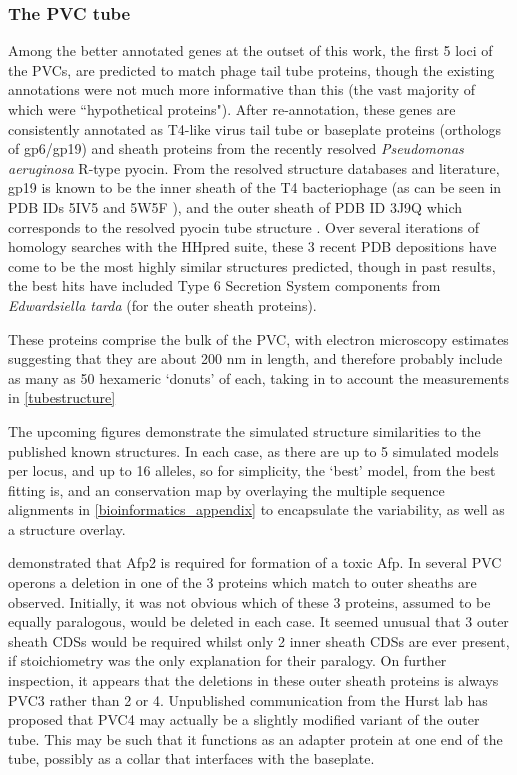 \subsubsection{The PVC tube}
Among the better annotated genes at the outset of this work, the first 5 loci of the PVCs, are predicted to match phage tail tube proteins, though the existing annotations were not much more informative than this (the vast majority of which were ``hypothetical proteins"). After re-annotation, these genes are consistently annotated as T4-like virus tail tube or baseplate proteins (orthologs of gp6/gp19) and sheath proteins from the recently resolved \emph{Pseudomonas aeruginosa} R-type pyocin. From the resolved structure databases and literature, gp19 is known to be the inner sheath of the T4 bacteriophage (as can be seen in PDB IDs 5IV5 and 5W5F \citep{Taylor2016, Zheng2017}), and the outer sheath of PDB ID 3J9Q which corresponds to the resolved pyocin tube structure \citep{Ge2015a}. Over several iterations of homology searches with the HHpred suite, these 3 recent PDB depositions have come to be the most highly similar structures predicted, though in past results, the best hits have included Type 6 Secretion System components from \emph{Edwardsiella tarda} (for the outer sheath proteins).

These proteins comprise the bulk of the PVC, with electron microscopy estimates suggesting that they are about 200 nm in length, and therefore probably include as many as 50 hexameric `donuts' of each, taking in to account the measurements in \vref{tubestructure}

The upcoming figures demonstrate the simulated structure similarities to the published known structures. In each case, as there are up to 5 simulated models per locus, and up to 16 alleles, so for simplicity, the `best' model, from the best fitting is, and an conservation map by overlaying the multiple sequence alignments in \ref{bioinformatics_appendix}  to encapsulate the variability, as well as a structure overlay.

\cite{Hurst2004} demonstrated that Afp2 is required for formation of a toxic Afp. In several PVC operons a deletion in one of the 3 proteins which match to outer sheaths are observed. Initially, it was not obvious which of these 3 proteins, assumed to be equally paralogous, would be deleted in each case. It seemed unusual that 3 outer sheath CDSs would be required whilst only 2 inner sheath CDSs are ever present, if stoichiometry was the only explanation for their paralogy. On further inspection, it appears that the deletions in these outer sheath proteins is always PVC3 rather than 2 or 4. Unpublished communication from the Hurst lab has proposed that PVC4 may actually be a slightly modified variant of the outer tube. This may be such that it functions as an adapter protein at one end of the tube, possibly as a collar that interfaces with the baseplate.

